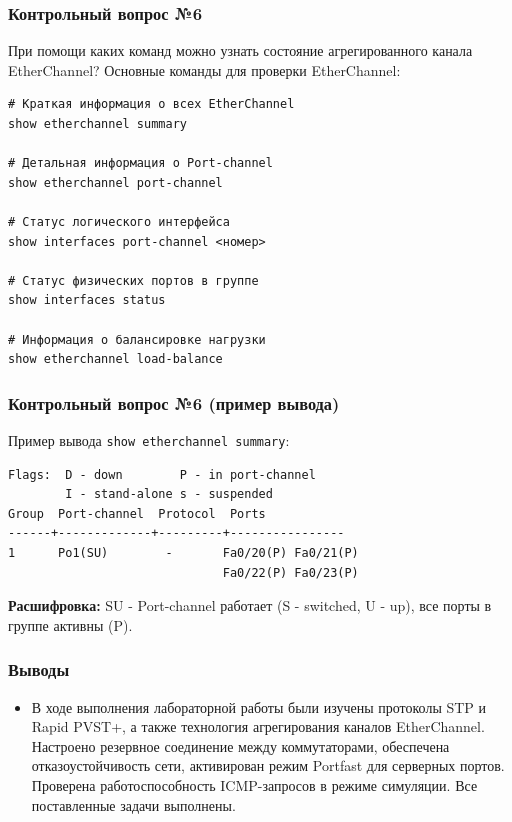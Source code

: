 \begin{frame}[containsverbatim]
\frametitle{Контрольный вопрос №6}
\begin{block}{При помощи каких команд можно узнать состояние агрегированного канала EtherChannel?}
Основные команды для проверки EtherChannel:
\begin{verbatim}
# Краткая информация о всех EtherChannel
show etherchannel summary

# Детальная информация о Port-channel
show etherchannel port-channel

# Статус логического интерфейса
show interfaces port-channel <номер>

# Статус физических портов в группе
show interfaces status

# Информация о балансировке нагрузки
show etherchannel load-balance
\end{verbatim}
\end{block}
\end{frame}

\begin{frame}[containsverbatim]
\frametitle{Контрольный вопрос №6 (пример вывода)}
\begin{block}{Пример вывода \texttt{show etherchannel summary}:}
\begin{verbatim}
Flags:  D - down        P - in port-channel
        I - stand-alone s - suspended
Group  Port-channel  Protocol  Ports
------+-------------+---------+----------------
1      Po1(SU)        -       Fa0/20(P) Fa0/21(P)
                              Fa0/22(P) Fa0/23(P)
\end{verbatim}
\textbf{Расшифровка:} SU - Port-channel работает (S - switched, U - up), все порты в группе активны (P).
\end{block}
\end{frame}

\begin{frame}
\frametitle{Выводы}
\begin{itemize}
	\item В ходе выполнения лабораторной работы были изучены протоколы STP и Rapid PVST+, а также технология агрегирования каналов EtherChannel. Настроено резервное соединение между коммутаторами, обеспечена отказоустойчивость сети, активирован режим Portfast для серверных портов. Проверена работоспособность ICMP-запросов в режиме симуляции. Все поставленные задачи выполнены.
\end{itemize}
\end{frame}


